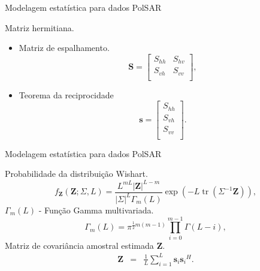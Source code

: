 \documentclass[10pt]{beamer}
\DeclareMathOperator{\traco}{tr} %
\begin{document}
\begin{frame}{Modelagem estatística para dados PolSAR}
	\begin{alertblock}{Matriz hermitiana.}
	\begin{itemize}
	\item Matriz de espalhamento.
	\begin{equation}\label{cap_acf_2}
\mathbf{S} = \left[
\begin{array}{cc}
	S_{hh}   & S_{hv}   \\
	S_{vh}   & S_{vv}   \\
\end{array}
\right],
\end{equation}
\item Teorema da reciprocidade
\begin{equation}\label{cap_acf_3}
\mathbf{s} = \left[
\begin{array}{c}
	S_{hh}      \\
    S_{vh}     \\
	S_{vv}      \\
\end{array}
\right].
\end{equation}
\end{itemize}
\end{alertblock}
\end{frame}

\begin{frame}[fragile]{Modelagem estatística para dados PolSAR}
      
  \alert{Probabilidade da distribuição Wishart.} 
%
\begin{equation}\label{cap_acf_4}
    f_{\mathbf{Z}}(\mathbf{Z};\Sigma,L)=\frac{L^{mL}|\mathbf{Z}|^{L-m}}{|\Sigma|^{L}\Gamma_m(L)} \exp(-L\traco{(\Sigma^{-1}\mathbf{Z})}), 
\end{equation}
    \alert{$\Gamma_m(L)$ - Função Gamma multivariada.}
\begin{equation}\label{cap_acf_5}
	\Gamma_m(L)=\pi^{\frac{1}{2}m(m-1)} \prod_{i=0}^{m-1}\Gamma(L-i),
\end{equation}
\alert{Matriz de covariância amostral estimada {\bf Z}.}
\begin{equation}\label{cap_acf_8}
\begin{array}{ccc}
    \mathbf{Z}&=&\frac{1}{L}\displaystyle{\sum_{i=1}^{L} {\mathbf{s}_i}{\mathbf{s}_i}^H}. \\
\end{array}
\end{equation}
\end{frame}
\end{document}
